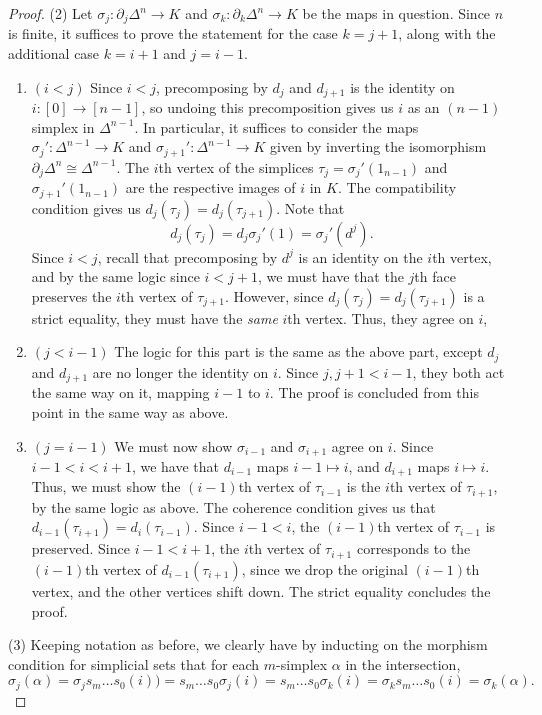 \begin{proof}
	(2) Let $\sigma _j : \partial _j\Delta ^{n}  \to K$ and $\sigma _k : \partial _k\Delta ^{n}  \to K$ be the maps in question. Since $n$ is finite, it suffices to prove the statement for the case $k=j+1$, along with the additional case $k=i+1$ and $j=i-1$.
	\begin{enumerate}
		\item $(i<j)$ Since $i<j$, precomposing by $d_j$ and $d_{j+1} $ is the identity on $i : [0] \to [n-1]$, so undoing this precomposition gives us $i$ as an $(n-1)$ simplex in $\Delta^{n-1} $. In particular, it suffices to consider the maps $\sigma_j' : \Delta^{n-1}  \to K$ and $\sigma_{j+1} ' : \Delta^{n-1}  \to K$ given by inverting the isomorphism $\partial _j\Delta^{n}\cong \Delta^{n-1} $. The $i$th vertex of the simplices $\tau_j = \sigma_j'(1_{n-1} )$ and $\sigma_{j+1}' (1_{n-1} )$ are the respective images of $i$ in $K$. The compatibility condition gives us $d_j(\tau_{j} )=d_{j} (\tau_{j+1} )$. Note that
			\[
				d_j(\tau_j)=d_j\sigma_j'(1)=\sigma_j'(d^j)
			.\]
			Since $i<j$, recall that precomposing by $d^j$ is an identity on the $i$th vertex, and by the same logic since $i<j+1$, we must have that the $j$th face preserves the $i$th vertex of $\tau_{j+1} $. However, since $d_j(\tau_j)=d_j(\tau_{j+1} )$ is a strict equality, they must have the \emph{same} $i$th vertex. Thus, they agree on $i$,
		\item $(j<i-1)$ The logic for this part is the same as the above part, except $d_j$ and $d_{j+1} $ are no longer the identity on $i$. Since $j,j+1< i-1$, they both act the same way on it, mapping $i-1$ to $i$. The proof is concluded from this point in the same way as above.
	\item $(j=i-1)$ We must now show $\sigma_{i-1} $ and $\sigma_{i+1} $ agree on $i$. Since $i-1<i<i+1$, we have that $d_{i-1} $ maps $i-1\mapsto i$, and $d_{i+1} $ maps $i\mapsto i$. Thus, we must show the $(i-1)$th vertex of $\tau_{i-1} $ is the $i$th vertex of $\tau_{i+1} $, by the same logic as above. The coherence condition gives us that $d_{i-1} (\tau_{i+1} )=d_i(\tau_{i-1} )$. Since $i-1<i$, the $(i-1)$th vertex of $\tau_{i-1} $ is preserved. Since $i-1<i+1$, the $i$th vertex of $\tau_{i+1} $ corresponds to the $(i-1)$th vertex of $d_{i-1} (\tau_{i+1} )$, since we drop the original $(i-1)$th vertex, and the other vertices shift down. The strict equality concludes the proof.
	\end{enumerate}
	

	(3) Keeping notation as before, we clearly have by inducting on the morphism condition for simplicial sets that for each $m$-simplex $\alpha $ in the intersection,
	\[
		\sigma _j(\alpha )=\sigma _js_m \ldots s_0(i))=s_m \ldots s_0 \sigma _j(i)=s_m \ldots s_0 \sigma _k(i)= \sigma _k s_m \ldots s_0(i)=\sigma _k(\alpha )
	.\]
\end{proof}

